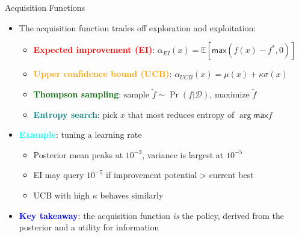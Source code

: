 \documentclass[
  10pt,
  ignorenonframetext,
]{beamer}
\providecommand{\tightlist}{%
  \setlength{\itemsep}{0pt}\setlength{\parskip}{0pt}}
\newcommand{\EE}{\mathbb{E}}
\def\max{\textsf{max}}
\begin{document}
\begin{frame}{Acquisition Functions}
\label{acquisition-functions}
\begin{itemize}
\tightlist
\item
  The acquisition function trades off exploration and exploitation:

  \begin{itemize}
  \tightlist
  \item
    \textbf{\textcolor{red}{Expected improvement (EI)}}:
    \(\alpha_{EI}(x) = \EE[\max(f(x) - f^*, 0)]\)
  \item
    \textbf{\textcolor{orange}{Upper confidence bound (UCB)}}:
    \(\alpha_{UCB}(x) = \mu(x) + \kappa \sigma(x)\)
  \item
    \textbf{\textcolor{darkgreen}{Thompson sampling}}: sample
    \(\tilde f \sim \Pr(f | \mathcal{D})\), maximize \(\tilde f\)
  \item
    \textbf{\textcolor{teal}{Entropy search}}: pick \(x\) that most
    reduces entropy of \(\arg\max f\)
  \end{itemize}
\item
  \textbf{\textcolor{cyan}{Example}}: tuning a learning rate

  \begin{itemize}
  \tightlist
  \item
    Posterior mean peaks at \(10^{-3}\), variance is largest at
    \(10^{-5}\)
  \item
    EI may query \(10^{-5}\) if improvement potential \textgreater{}
    current best
  \item
    UCB with high \(\kappa\) behaves similarly
  \end{itemize}
\item
  \textbf{\textcolor{blue}{Key takeaway}}: the acquisition function
  \emph{is} the policy, derived from the posterior and a utility for
  information
\end{itemize}
\end{frame}
\end{document}
